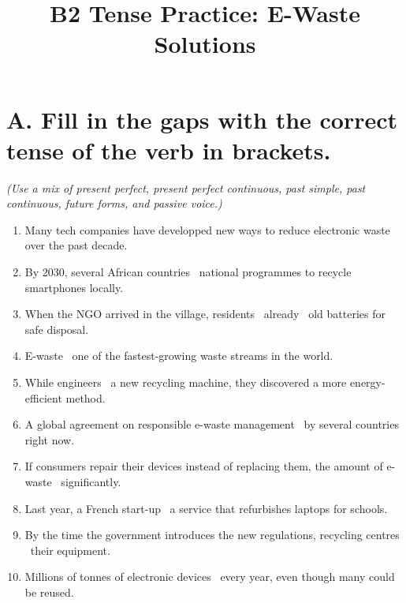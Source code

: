 \documentclass[12pt,a4paper]{article}
\title{\textbf{B2 Tense Practice: E-Waste Solutions}}
\author{}
\date{}
\newcommand{\gap}{\uline{\hspace{3cm}}}
\begin{document}
\maketitle

\section*{A. Fill in the gaps with the correct tense of the verb in brackets.}

\textit{(Use a mix of present perfect, present perfect continuous, past simple, past continuous, future forms, and passive voice.)}

\vspace{0.5cm}

\begin{enumerate}[leftmargin=*, label=\textbf{\arabic*.}]

  \item Many tech companies have developped new ways to reduce electronic waste over the past decade.

  \item By 2030, several African countries \gap\ national programmes to recycle smartphones locally.

  \item When the NGO arrived in the village, residents \gap\ already \gap\ old batteries for safe disposal.

  \item E-waste \gap\ one of the fastest-growing waste streams in the world.

  \item While engineers \gap\ a new recycling machine, they discovered a more energy-efficient method.

  \item A global agreement on responsible e-waste management \gap\ by several countries right now.

  \item If consumers repair their devices instead of replacing them, the amount of e-waste \gap\ significantly.

  \item Last year, a French start-up \gap\ a service that refurbishes laptops for schools.

  \item By the time the government introduces the new regulations, recycling centres \gap\ their equipment.

  \item Millions of tonnes of electronic devices \gap\ every year, even though many could be reused.

\end{enumerate}
\end{document}
